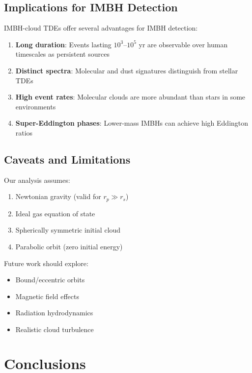 \documentclass[twocolumn,amsmath,amssymb,prd,superscriptaddress,nofootinbib]{revtex4-2}
\begin{document}
\subsection{Implications for IMBH Detection}
\label{sec:imbh_detection}

IMBH-cloud TDEs offer several advantages for IMBH detection:

\begin{enumerate}
    \item \textbf{Long duration}: Events lasting $10^3$--$10^5$ yr are observable over human timescales as persistent sources

    \item \textbf{Distinct spectra}: Molecular and dust signatures distinguish from stellar TDEs

    \item \textbf{High event rates}: Molecular clouds are more abundant than stars in some environments

    \item \textbf{Super-Eddington phases}: Lower-mass IMBHs can achieve high Eddington ratios
\end{enumerate}

\subsection{Caveats and Limitations}
\label{sec:caveats}

Our analysis assumes:
\begin{enumerate}
    \item Newtonian gravity (valid for $r_p \gg r_s$)
    \item Ideal gas equation of state
    \item Spherically symmetric initial cloud
    \item Parabolic orbit (zero initial energy)
\end{enumerate}

Future work should explore:
\begin{itemize}
    \item Bound/eccentric orbits
    \item Magnetic field effects
    \item Radiation hydrodynamics
    \item Realistic cloud turbulence
\end{itemize}

\section{Conclusions}
\label{sec:conclusions}
\end{document}
